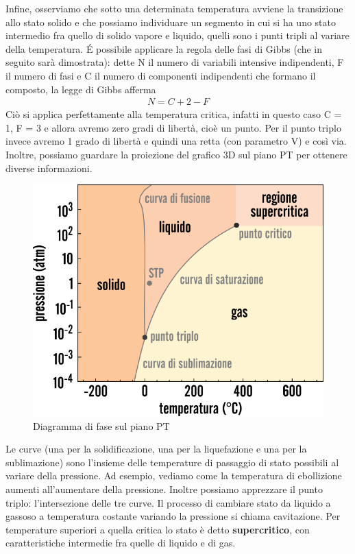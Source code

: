 \documentclass[10pt,a4paper]{article}
\begin{document}
Infine, osserviamo che sotto una determinata temperatura avviene la transizione allo stato solido e che possiamo individuare un segmento in cui si ha uno stato intermedio fra quello di solido vapore e liquido, quelli sono i punti tripli al variare della temperatura. \'{E} possibile applicare la regola delle fasi di Gibbs (che in seguito sarà dimostrata): dette N il numero di variabili intensive indipendenti, F il numero di fasi e C il numero di componenti indipendenti che formano il composto, la legge di Gibbs afferma
\begin{align*} 
	N = C + 2 - F
\end{align*}  
Ciò si applica perfettamente alla temperatura critica, infatti in questo caso C = 1, F = 3 e allora avremo zero gradi di libertà, cioè un punto. Per il punto triplo invece avremo 1 grado di libertà e quindi una retta (con parametro V) e così via.\\
Inoltre, possiamo guardare la proiezione del grafico 3D sul piano PT per ottenere diverse informazioni. 
\begin{figure}[h!]
	\centering
	\includegraphics[width=0.6\linewidth]{../images/diagrammadifasePT}
	\caption{Diagramma di fase sul piano PT}
	\label{fig:diagrammadifasept}
\end{figure}
\FloatBarrier
Le curve (una per la solidificazione, una per la liquefazione e una per la sublimazione) sono l'insieme delle temperature di passaggio di stato possibili al variare della pressione. Ad esempio, vediamo come la temperatura di ebollizione aumenti all'aumentare della pressione. Inoltre possiamo apprezzare il punto triplo: l'intersezione delle tre curve. Il processo di cambiare stato da liquido a gassoso a temperatura costante variando la pressione si chiama cavitazione. Per temperature superiori a quella critica lo stato è detto \textbf{supercritico}, con caratteristiche intermedie fra quelle di liquido e di gas. 
\end{document}
